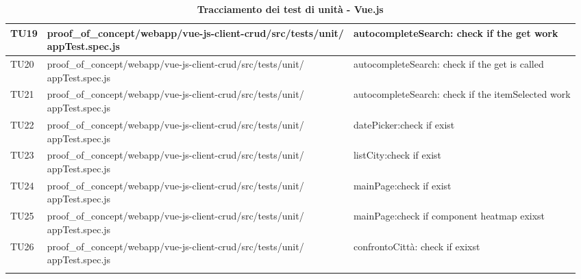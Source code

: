 \begin{center}
\begin{longtable}{|p{1.5cm}|p{11.5cm}|p{3.5cm}|}
		\hline
		\centering TU19 & \makecell[c]{proof{\_}of{\_}concept/webapp/vue-js-client-crud/src/tests/unit/\\appTest.spec.js} & {autocompleteSearch: check if the get work}\\
		\hline
		\centering TU20 & \makecell[c]{proof{\_}of{\_}concept/webapp/vue-js-client-crud/src/tests/unit/\\appTest.spec.js} & {autocompleteSearch: check if the get is called}\\
		\hline
		\centering TU21 & \makecell[c]{proof{\_}of{\_}concept/webapp/vue-js-client-crud/src/tests/unit/\\appTest.spec.js} & {autocompleteSearch: check if the itemSelected work}\\
		\hline
		\centering TU22 & \makecell[c]{proof{\_}of{\_}concept/webapp/vue-js-client-crud/src/tests/unit/\\appTest.spec.js} & {datePicker:check if exist}\\
		\hline
		\centering TU23 & \makecell[c]{proof{\_}of{\_}concept/webapp/vue-js-client-crud/src/tests/unit/\\appTest.spec.js} & {listCity:check if exist}\\		
		\hline
		\centering TU24 & \makecell[c]{proof{\_}of{\_}concept/webapp/vue-js-client-crud/src/tests/unit/\\appTest.spec.js} & {mainPage:check if exist}\\
		\hline
		\centering TU25 & \makecell[c]{proof{\_}of{\_}concept/webapp/vue-js-client-crud/src/tests/unit/\\appTest.spec.js} & {mainPage:check if component heatmap exixst}\\
		\hline
		\centering TU26 & \makecell[c]{proof{\_}of{\_}concept/webapp/vue-js-client-crud/src/tests/unit/\\appTest.spec.js} & {confrontoCittà: check if exixst }\\
		\hline
		\rowcolor{white}
		\caption{\textbf{Tracciamento dei test di unità - Vue.js}}
	\end{longtable}
\end{center}

